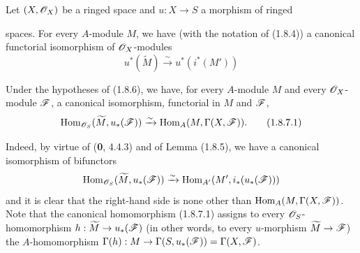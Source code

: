 \begin{corollary}[1.8.6]
\label{ega2:addendum:I.1.8.6}
Let $(X,\mathscr{O}_X)$ be a ringed space and $u:X\to S$ a morphism
of ringed
spaces. For every $A$-module $M$, we have (with the notation of \textup{(1.8.4))} a
canonical functorial isomorphism of $\mathscr{O}_X$-modules
\begin{equation}
\label{ega2:addendum:I.1.8.6.1}
  u^*(\widetilde M)\xrightarrow{\sim} u^*(i^*(M'))
\tag{1.8.6.1}
\end{equation}
\end{corollary}

\begin{corollary}[1.8.7]
\label{ega2:addendum:I.1.8.7}
Under the hypotheses of \textup{(1.8.6)}, we have, for every $A$-module $M$ and every
$\mathscr{O}_X$-module $\mathscr{F}$, a canonical isomorphism, functorial in
$M$ and $\mathscr{F}$,
\begin{equation}
\label{ega2:addendum:I.1.8.7.1}
  \operatorname{Hom}_{\mathscr{O}_S}(\widetilde M,u_*(\mathscr{F}))
  \xrightarrow{\sim}\operatorname{Hom}_A(M,\Gamma(X,\mathscr{F})).
\tag{1.8.7.1}
\end{equation}
\end{corollary}

Indeed, by virtue of (\textbf{0}, 4.4.3) and of Lemma (1.8.5), we have a
canonical isomorphism of bifunctors
\[
  \operatorname{Hom}_{\mathscr{O}_S}(\widetilde M,u_*(\mathscr{F}))
  \xrightarrow{\sim}\operatorname{Hom}_{A'}(M',i_*(u_*(\mathscr{F})))
\]
and it is clear that the right-hand side is none other than
$\operatorname{Hom}_A(M,\Gamma(X,\mathscr{F}))$. Note that the canonical homomorphism
(1.8.7.1) assigns to every $\mathscr{O}_S$-homomorphism
$h:\widetilde M\to u_*(\mathscr{F})$ (in other words, to every $u$-morphism
$\widetilde M\to\mathscr{F}$) the $A$-homomorphism $\Gamma(h):M\to\Gamma(S,u_*(\mathscr{F}))=\Gamma(X,\mathscr{F})$.

